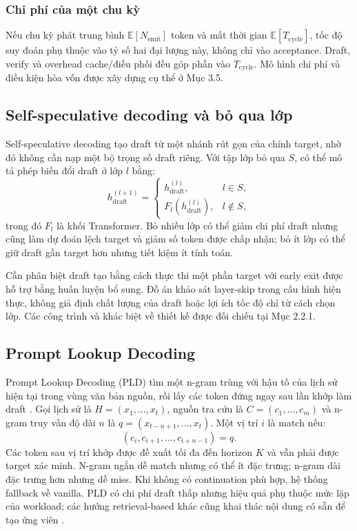\subsubsection{Chi phí của một chu kỳ}
Nếu chu kỳ phát trung bình $\mathbb{E}[N_{\mathrm{emit}}]$ token và mất thời gian $\mathbb{E}[T_{\mathrm{cycle}}]$, tốc độ suy đoán phụ thuộc vào tỷ số hai đại lượng này, không chỉ vào acceptance. Draft, verify và overhead cache/điều phối đều góp phần vào $T_{\mathrm{cycle}}$. Mô hình chi phí và điều kiện hòa vốn được xây dựng cụ thể ở Mục 3.5.

\subsection{Self-speculative decoding và bỏ qua lớp}
Self-speculative decoding tạo draft từ một nhánh rút gọn của chính target, nhờ đó không cần nạp một bộ trọng số draft riêng. Với tập lớp bỏ qua $S$, có thể mô tả phép biến đổi draft ở lớp $l$ bằng:
\begin{equation}
    h^{(l+1)}_{\mathrm{draft}}=
    \begin{cases}
      h^{(l)}_{\mathrm{draft}}, & l\in S,\\
      F_l(h^{(l)}_{\mathrm{draft}}), & l\notin S,
    \end{cases}
\end{equation}
trong đó $F_l$ là khối Transformer. Bỏ nhiều lớp có thể giảm chi phí draft nhưng cũng làm dự đoán lệch target và giảm số token được chấp nhận; bỏ ít lớp có thể giữ draft gần target hơn nhưng tiết kiệm ít tính toán.

Cần phân biệt draft tạo bằng cách thực thi một phần target với early exit được hỗ trợ bằng huấn luyện bổ sung. Đồ án khảo sát layer-skip trong cấu hình hiện thực, không giả định chất lượng của draft hoặc lợi ích tốc độ chỉ từ cách chọn lớp. Các công trình và khác biệt về thiết kế được đối chiếu tại Mục 2.2.1.

\subsection{Prompt Lookup Decoding}
Prompt Lookup Decoding (PLD) tìm một n-gram trùng với hậu tố của lịch sử hiện tại trong vùng văn bản nguồn, rồi lấy các token đứng ngay sau lần khớp làm draft \cite{saxena2024promptlookup}. Gọi lịch sử là $H=(x_1,\ldots,x_t)$, nguồn tra cứu là $C=(c_1,\ldots,c_m)$ và n-gram truy vấn độ dài $n$ là $q=(x_{t-n+1},\ldots,x_t)$. Một vị trí $i$ là match nếu:
\begin{equation}
    (c_i,c_{i+1},\ldots,c_{i+n-1})=q.
\end{equation}
Các token sau vị trí khớp được đề xuất tối đa đến horizon $K$ và vẫn phải được target xác minh. N-gram ngắn dễ match nhưng có thể ít đặc trưng; n-gram dài đặc trưng hơn nhưng dễ miss. Khi không có continuation phù hợp, hệ thống fallback về vanilla. PLD có chi phí draft thấp nhưng hiệu quả phụ thuộc mức lặp của workload; các hướng retrieval-based khác cũng khai thác nội dung có sẵn để tạo ứng viên \cite{he2024rest}.

